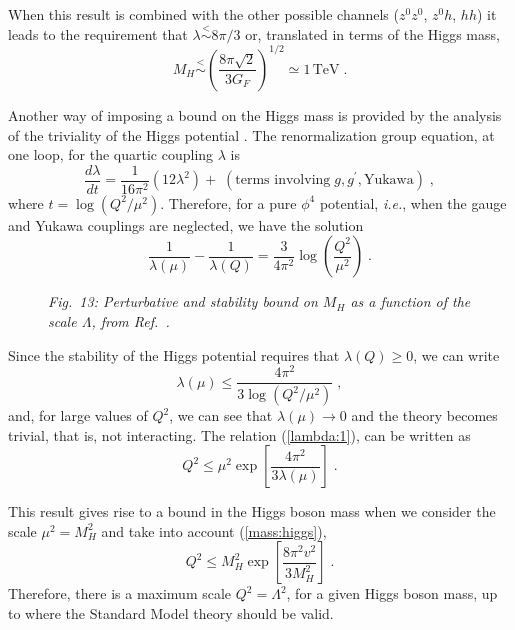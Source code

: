 \documentclass[12pt]{report}
\renewcommand{\lesssim}{\stackrel{<}{\sim}}
\begin{document}
When this result is combined with the other possible channels ($z^0
z^0$, $z^0 h$, $hh$) it leads to the requirement that $\lambda \lesssim
8 \pi/3$ or, translated in terms of the Higgs mass,
\[
M_H \lesssim \left( \frac{8 \pi \sqrt{2}}{3 G_F} \right)^{1/2} \simeq
1 \, \mbox{TeV} \; .
\]

Another way of imposing a bound on the Higgs mass is provided by the
analysis of the triviality of the Higgs potential \cite{Sher:89}. The
renormalization group equation, at one loop, for the quartic coupling
$\lambda$ is
\[
\frac{d\lambda}{dt} = \frac{1}{16 \pi^2} \left(12 \lambda^2 \right) +
\; (\mbox{terms involving} \;  g, g^\prime, \mbox{Yukawa})  \; ,
\]
where $t=\log(Q^2/\mu^2)$. Therefore, for a pure $\phi^4$ potential,
{\it i.e.}, when the gauge and Yukawa couplings are neglected, we have
the solution
\[
\frac{1}{\lambda(\mu)} - \frac{1}{\lambda(Q)} = 
\frac{3}{4 \pi^2} \log\left(\frac{Q^2}{\mu^2}\right) \; .
\]

\begin{figure}[ht]
\protect
\epsfxsize=10cm
\begin{center}
\mbox{}
\end{center}
\begin{center}
\begin{minipage}[h]{12cm}
\begin{center}
{\it Fig.\ 13: Perturbative and stability bound on $M_H$ as a
function of the scale $\Lambda$, from Ref.\ \cite{Casas:95}.}
\end{center}
\end{minipage}
\end{center}
\end{figure}

Since the stability of the Higgs potential requires that $\lambda(Q)
\geq  0$, we can write
\begin{equation}
\lambda(\mu) \leq \frac{4 \pi^2}{3\log(Q^2/\mu^2)} \; ,
\label{lambda:1}
\end{equation}
and, for large values of $Q^2$, we can see that $\lambda(\mu) \to 0$ and
the theory becomes trivial, that is, not interacting. The relation
(\ref{lambda:1}), can be written as
\[
Q^2 \leq \mu^2 \exp\left[\frac{4 \pi^2}{3 \lambda(\mu)} \right] \; .
\]

This result gives rise to a bound in the Higgs boson mass when we
consider the scale $\mu^2 = M_H^2$ and take into account 
(\ref{mass:higgs}),
\[
Q^2 \leq M_H^2 \exp\left[\frac{8 \pi^2 v^2}{3 M_H^2} \right]\; .
\]
Therefore, there is a maximum scale $Q^2 = \Lambda^2$, for a given
Higgs boson mass, up to where the Standard Model theory should be
valid.
\end{document}
